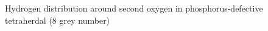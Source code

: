 \documentclass[11pt]{article}
\begin{document}
\begin{figure}[H]
\begin{minipage}[h]{0.5\linewidth}
\end{minipage}
\hfill
\begin{minipage}[h]{0.5\linewidth}
\end{minipage}
\caption{Hydrogen distribution around second oxygen in phosphorus-defective tetraherdal (8 grey number)}
\label{HinO1and2}
\end{figure}
\end{document}
